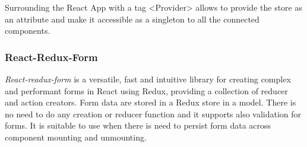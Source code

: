 Surrounding the React App with a tag <Provider> allows to provide the store as an attribute and make it accessible as a singleton to all the connected components.

\subsubsection*{React-Redux-Form}
\textit{React-readux-form} is a versatile, fast and intuitive library for creating complex and performant forms in React using Redux, providing a collection of reducer and action creators. Form data are stored in a Redux store in a model. There is no need to do any creation or reducer function and it supports also validation for forms. It is suitable to use when there is need to persist form data across component mounting and unmounting.
